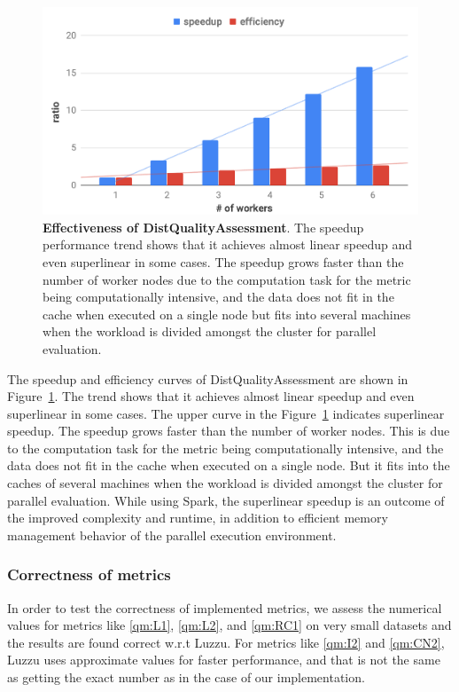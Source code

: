 \begin{figure}
\includegraphics[width=1.0\columnwidth]{images/5_distqualityassessment/distqualityassessment-effectiveness.pdf}
\caption{\textbf{Effectiveness of DistQualityAssessment}.
The speedup performance trend shows that it achieves almost linear speedup and even superlinear in some cases.
The speedup grows faster than the number of worker nodes due to the computation task for the metric being computationally intensive, and the data does not fit in the cache when executed on a single node but fits into several machines when the workload is divided amongst the cluster for parallel evaluation.
}
\label{fig:distqualityassessment-effectiveness}
\end{figure}

The speedup and efficiency curves of DistQualityAssessment are shown in Figure~\ref{fig:distqualityassessment-effectiveness}.
The trend shows that it achieves almost linear speedup and even superlinear in some cases.
The upper curve in the Figure~\ref{fig:distqualityassessment-effectiveness} indicates superlinear speedup. 
The speedup grows faster than the number of worker nodes.
This is due to the computation task for the metric being computationally intensive, and the data does not fit in the cache when executed on a single node. 
But it fits into the caches of several machines when the workload is divided amongst the cluster for parallel evaluation.
While using Spark, the superlinear speedup is an outcome of the improved complexity and runtime, in addition to efficient memory management behavior of the parallel execution environment.

\subsubsection{Correctness of metrics}
In order to test the correctness of implemented metrics, we assess the numerical values for metrics like \ref{qm:L1}, \ref{qm:L2}, and \ref{qm:RC1} on very small datasets and the results are found correct w.r.t Luzzu. 
For metrics like \ref{qm:I2} and \ref{qm:CN2}, Luzzu uses approximate values for faster performance, and that is not the same as getting the exact number as in the case of our implementation.

